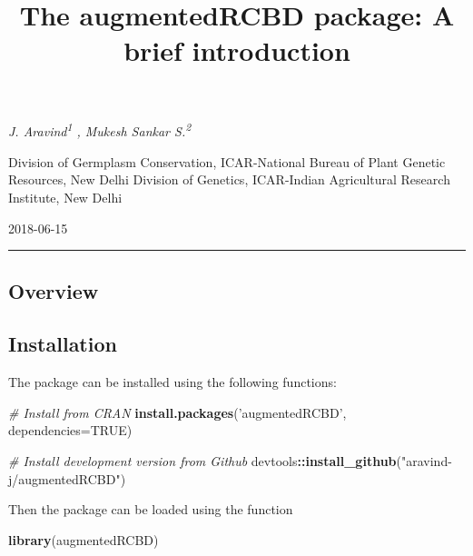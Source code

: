\documentclass[]{article}
\title{The \textbf{augmentedRCBD} package: A brief introduction}
\author{}
\date{}
\newenvironment{Shaded}{\begin{snugshade}}{\end{snugshade}}
\newcommand{\CommentTok}[1]{\textcolor[rgb]{0.56,0.35,0.01}{\textit{#1}}}
\newcommand{\DataTypeTok}[1]{\textcolor[rgb]{0.13,0.29,0.53}{#1}}
\newcommand{\KeywordTok}[1]{\textcolor[rgb]{0.13,0.29,0.53}{\textbf{#1}}}
\newcommand{\NormalTok}[1]{#1}
\newcommand{\OperatorTok}[1]{\textcolor[rgb]{0.81,0.36,0.00}{\textbf{#1}}}
\newcommand{\OtherTok}[1]{\textcolor[rgb]{0.56,0.35,0.01}{#1}}
\newcommand{\StringTok}[1]{\textcolor[rgb]{0.31,0.60,0.02}{#1}}
\begin{document}
\maketitle

\begin{center}
 {\it J. Aravind\textsuperscript{1} , Mukesh Sankar S.\textsuperscript{2}}
\end{center}

\begin{center}
 Division of Germplasm Conservation, ICAR-National Bureau of Plant Genetic Resources, New Delhi
 Division of Genetics, ICAR-Indian Agricultural Research Institute, New Delhi
\end{center}

\begin{center}
2018-06-15
\end{center}

\begin{center}
\vspace{6pt}
\hrule
\end{center}

\tableofcontents

\hypertarget{overview}{%
\subsection{Overview}\label{overview}}

\hypertarget{installation}{%
\subsection{Installation}\label{installation}}

The package can be installed using the following functions:

\begin{Shaded}
\begin{Highlighting}[]
\CommentTok{# Install from CRAN}
\KeywordTok{install.packages}\NormalTok{(}\StringTok{'augmentedRCBD'}\NormalTok{, }\DataTypeTok{dependencies=}\OtherTok{TRUE}\NormalTok{)}

\CommentTok{# Install development version from Github}
\NormalTok{devtools}\OperatorTok{::}\KeywordTok{install_github}\NormalTok{(}\StringTok{"aravind-j/augmentedRCBD"}\NormalTok{)}
\end{Highlighting}
\end{Shaded}

Then the package can be loaded using the function

\begin{Shaded}
\begin{Highlighting}[]
\KeywordTok{library}\NormalTok{(augmentedRCBD)}
\end{Highlighting}
\end{Shaded}
\end{document}
